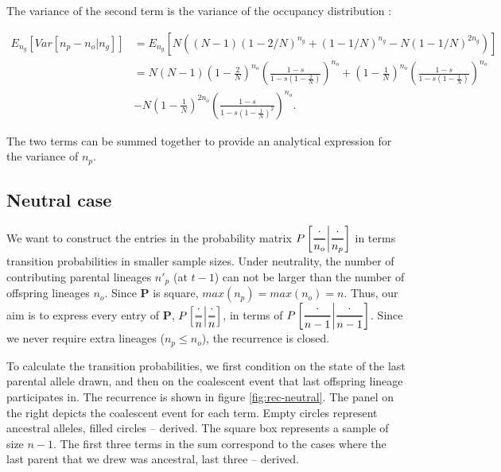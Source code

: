 \documentclass[review]{elsarticle}
\newcommand{\Dfrac}[2]{%
  \ooalign{%
    $\genfrac{}{}{1.2pt}0{#1}{#2}$\cr%
    $\color{white}\genfrac{}{}{.4pt}0{\phantom{#1}}{\phantom{#2}}$}%
}
\newcommand{\cond}{\middle\vert}
\begin{document}
The variance of the second term is the variance of the occupancy distribution \cite{}:

\begin{equation}
\begin{split}
E_{n_g}\left[Var\left[n_p-n_o | n_g \right]\right] & = E_{n_g}\left[N ((N - 1) (1 - 2/N)^{n_g} + (1 - 1/N)^{n_g} - N (1 - 1/N)^{2 n_g}) \right] \\
& = N (N-1)  \left(1-\frac{2}{N}\right)^{n_o} \left(\frac{1-s}{1-s  \left(1-\frac{2}{N}\right)}\right)^{n_o} +  \left(1-\frac{1}{N}\right)^{n_o} \left(\frac{1-s}{1-s  \left(1-\frac{1}{N}\right)}\right)^{n_o} \\
&-N  \left(1-\frac{1}{N}\right)^{2n_o} \left(\frac{1-s}{1-s  \left(1-\frac{1}{N}\right)^2}\right)^{n_o}. 
\end{split}
\end{equation}

The two terms can be summed together to provide an analytical expression for the variance of $n_p$. 

\subsection{Neutral case}

We want to construct the entries in the probability matrix
$P\left[ \Dfrac{\cdot}{n_o} \cond \Dfrac{\cdot}{n_p} \right]$ in terms transition probabilities in
smaller sample sizes. Under neutrality, the number of contributing parental lineages $n'_p$ (at
$t-1$) can not be larger than the number of offspring lineages $n_o$. Since $\mathbf{P}$ is square,
$max(n_p)=max(n_o)=n$. Thus, our aim is to express every entry of $\mathbf{P}$,
$P\left[ \Dfrac{\cdot}{n} \cond\Dfrac{\cdot}{n} \right]$, in terms of
$P\left[ \Dfrac{\cdot}{n-1} \cond \Dfrac{\cdot}{n-1} \right]$. Since we never require extra lineages
($n_p\le n_o$), the recurrence is closed.

To calculate the transition probabilities, we first condition on the state of the last parental
allele drawn, and then on the coalescent event that last offspring lineage participates in. The
recurrence is shown in figure \ref{fig:rec-neutral}. The panel on the right depicts the coalescent
event for each term. Empty circles represent ancestral alleles, filled circles -- derived. The
square box represents a sample of size $n-1$. The first three terms in the sum correspond to the
cases where the last parent that we drew was ancestral, last three -- derived.
\end{document}
